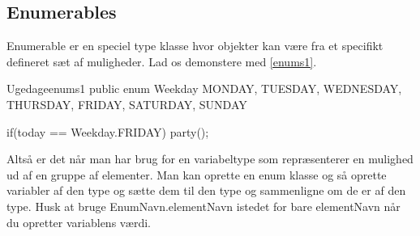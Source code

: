 \subsection{Enumerables}
Enumerable er en speciel type klasse hvor objekter kan være fra et specifikt defineret sæt af muligheder. Lad os demonstere med \autoref{enums1}.
\begin{JavaCode}{Ugedage}{enums1}
	public enum Weekday{
		MONDAY, TUESDAY, WEDNESDAY, THURSDAY, FRIDAY, SATURDAY, SUNDAY
	}
	
	if(today == Weekday.FRIDAY){
		party();
	}
\end{JavaCode}
Altså er det når man har brug for en variabeltype som repræsenterer en mulighed ud af en gruppe af elementer. Man kan oprette en enum klasse og så oprette variabler af den type og sætte dem til den type og sammenligne om de er af den type. Husk at bruge EnumNavn.elementNavn istedet for bare elementNavn når du opretter variablens værdi.

